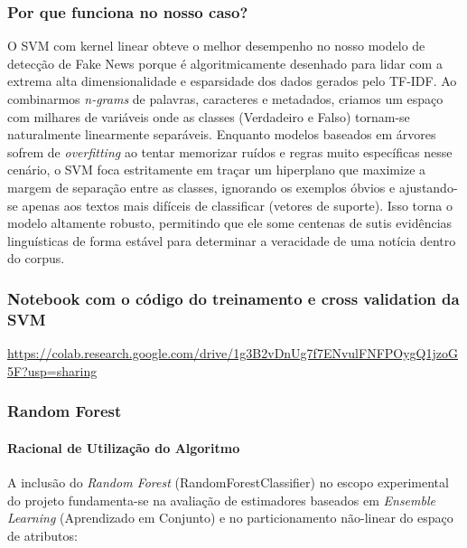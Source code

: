 \documentclass[
  brazilian,
  11pt,
]{article}
\begin{document}
\subsubsection{Por que funciona no nosso caso?}\label{por-que-funciona-no-nosso-caso}

O SVM com kernel linear obteve o melhor desempenho no nosso modelo de detecção de Fake News porque é algoritmicamente desenhado para lidar com a extrema alta dimensionalidade e esparsidade dos dados gerados pelo TF-IDF. Ao combinarmos \emph{n-grams} de palavras, caracteres e metadados, criamos um espaço com milhares de variáveis onde as classes (Verdadeiro e Falso) tornam-se naturalmente linearmente separáveis. Enquanto modelos baseados em árvores sofrem de \emph{overfitting} ao tentar memorizar ruídos e regras muito específicas nesse cenário, o SVM foca estritamente em traçar um hiperplano que maximize a margem de separação entre as classes, ignorando os exemplos óbvios e ajustando-se apenas aos textos mais difíceis de classificar (vetores de suporte). Isso torna o modelo altamente robusto, permitindo que ele some centenas de sutis evidências linguísticas de forma estável para determinar a veracidade de uma notícia dentro do corpus.

\subsubsection{Notebook com o código do treinamento e cross validation da SVM}\label{notebook-com-o-cuxf3digo-do-treinamento-e-cross-validation-da-svm}

\url{https://colab.research.google.com/drive/1g3B2vDnUg7f7ENvulFNFPOygQ1jzoG5F?usp=sharing}

\subsubsection{Random Forest}\label{random-forest}

\paragraph{Racional de Utilização do Algoritmo}\label{racional-de-utilizauxe7uxe3o-do-algoritmo}

A inclusão do \emph{Random Forest} (RandomForestClassifier) no escopo experimental do projeto fundamenta-se na avaliação de estimadores baseados em \emph{Ensemble Learning} (Aprendizado em Conjunto) e no particionamento não-linear do espaço de atributos:
\end{document}
